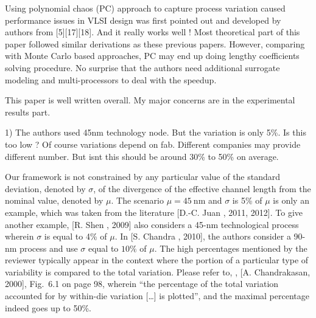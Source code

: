 \begin{reviewer}
Using polynomial chaos (PC) approach to capture process variation caused performance issues in VLSI design was first pointed out and developed by authors from [5][17][18]. And it really works well ! Most theoretical part of this paper followed similar derivations as these previous papers. However, comparing with Monte Carlo based approaches, PC may end up doing  lengthy  coefficients solving procedure. No surprise that the authors need additional surrogate modeling and multi-processors to deal with the speedup.

This paper is well written overall. My major concerns are in the experimental results part.

1) The authors used 45nm technology node. But the variation is only 5\%. Is this too low ? Of course variations depend on fab. Different companies may provide different number. But isnt this should be around 30\% to 50\% on average.
\end{reviewer}
\begin{authors}
Our framework is not constrained by any particular value of the standard deviation, denoted by $\sigma$, of the divergence of the effective channel length from the nominal value, denoted by $\mu$.
The scenario $\mu = 45~\text{nm}$ and $\sigma$ is 5\% of $\mu$ is only an example, which was taken from the literature [D.-C. Juan \etal, 2011, 2012].
To give another example, [R. Shen \etal, 2009] also considers a 45-nm technological process wherein $\sigma$ is equal to 4\% of $\mu$.
In [S. Chandra \etal, 2010], the authors consider a 90-nm process and use $\sigma$ equal to $10\%$ of $\mu$.
The high percentages mentioned by the reviewer typically appear in the context where the portion of a particular type of variability is compared to the total variation.
Please refer to, \eg, [A. Chandrakasan, 2000], Fig.~6.1 on page 98, wherein ``the percentage of the total variation accounted for by within-die variation [\ldots] is plotted'', and the maximal percentage indeed goes up to 50\%.

\end{authors}

